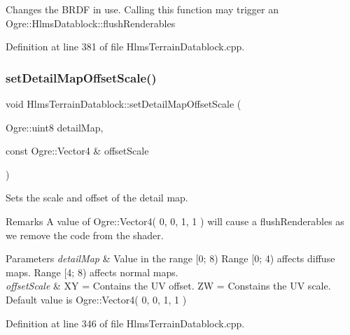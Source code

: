 Changes the B\+R\+DF in use. Calling this function may trigger an Ogre\+::\+Hlms\+Datablock\+::flush\+Renderables 

Definition at line 381 of file Hlms\+Terrain\+Datablock.\+cpp.

\mbox{\label{class_hlms_terrain_datablock_af4b0ac3a3030192a4bb2200567dcc1fd}} 
\subsubsection{\texorpdfstring{set\+Detail\+Map\+Offset\+Scale()}{setDetailMapOffsetScale()}}
{\footnotesize\ttfamily void Hlms\+Terrain\+Datablock\+::set\+Detail\+Map\+Offset\+Scale (\begin{DoxyParamCaption}\item[{Ogre\+::uint8}]{detail\+Map,  }\item[{const Ogre\+::\+Vector4 \&}]{offset\+Scale }\end{DoxyParamCaption})}

Sets the scale and offset of the detail map. \begin{DoxyRemark}{Remarks}
A value of Ogre\+::\+Vector4( 0, 0, 1, 1 ) will cause a flush\+Renderables as we remove the code from the shader. 
\end{DoxyRemark}

\begin{DoxyParams}{Parameters}
{\em detail\+Map} & Value in the range \mbox{[}0; 8) Range \mbox{[}0; 4) affects diffuse maps. Range \mbox{[}4; 8) affects normal maps. \\
\hline
{\em offset\+Scale} & XY = Contains the UV offset. ZW = Constains the UV scale. Default value is Ogre\+::\+Vector4( 0, 0, 1, 1 ) \\
\hline
\end{DoxyParams}


Definition at line 346 of file Hlms\+Terrain\+Datablock.\+cpp.

\mbox{\label{class_hlms_terrain_datablock_acd5e39eb1968ddda8f05d5537fe3f945}} 
